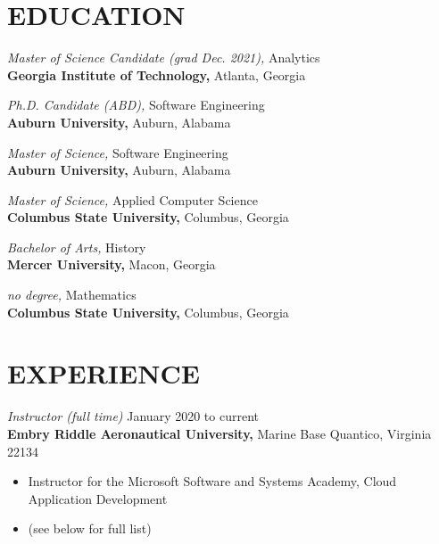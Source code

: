 \documentclass[margin, 10pt]{res} %
\begin{document}
\begin{resume}

\section{EDUCATION}

    {\it Master of Science Candidate (grad Dec. 2021),} Analytics\\
\textbf{Georgia Institute of Technology,} Atlanta, Georgia

    {\it Ph.D. Candidate (ABD),} Software Engineering\\
\textbf{Auburn University,} Auburn, Alabama

{\it Master of Science,} Software Engineering\\
\textbf{Auburn University,} Auburn, Alabama

{\it Master of Science,} Applied Computer Science\\
\textbf{Columbus State University,} Columbus, Georgia

{\it Bachelor of Arts,} History\\
\textbf{Mercer University,} Macon, Georgia

{\it no degree,} Mathematics\\
\textbf{Columbus State University,} Columbus, Georgia

 
\section{EXPERIENCE}
 
%

{\it Instructor (full time)} \hfill January 2020 to current \\
\textbf{Embry Riddle Aeronautical University,} Marine Base Quantico, Virginia 22134
\begin{itemize} \itemsep -2pt %
\item Instructor for the Microsoft Software and Systems Academy, Cloud Application Development
\item (see below for full list)
\end{itemize}


\end{resume}
\end{document}
